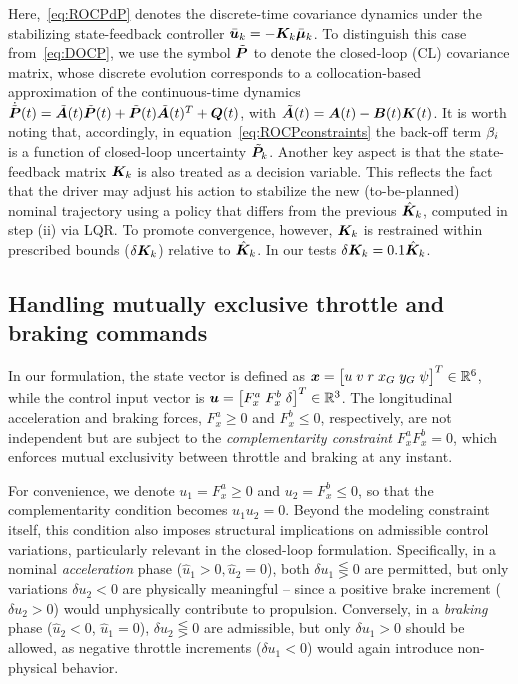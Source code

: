 Here,~\eqref{eq:ROCPdP} denotes the discrete-time covariance dynamics under the stabilizing state-feedback controller \( \bar{\boldsymbol{u}}_k = -\boldsymbol{K}_k \bar{\boldsymbol{\mu}}_k \). To distinguish this case from~\eqref{eq:DOCP}, we use the symbol \( \tilde{\boldsymbol{P}} \) to denote the closed-loop (CL) covariance matrix, whose discrete evolution corresponds to a collocation-based approximation of the continuous-time dynamics $\dot{\tilde{\boldsymbol{P}}}(t) = \tilde{\boldsymbol{A}}(t) \tilde{\boldsymbol{P}}(t) + \tilde{\boldsymbol{P}}(t)\tilde{\boldsymbol{A}}(t)^T + \boldsymbol{Q}(t)$, with $\tilde{\boldsymbol{A}}(t)=\boldsymbol{A}(t)-\boldsymbol{B}(t)\boldsymbol{K}(t)$. It is worth noting that, accordingly, in equation~\eqref{eq:ROCPconstraints} the back-off term $\beta_i$ is a function of closed-loop uncertainty $\tilde{\boldsymbol{P}}_k$. Another key aspect is that the state-feedback matrix $\boldsymbol{K}_k$ is also treated as a decision variable. This reflects the fact that the driver may adjust his action to stabilize the new (to-be-planned) nominal trajectory using a policy that differs from the previous $\hat{\boldsymbol{K}}_k$, computed in step (ii) via LQR. To promote convergence, however, $\boldsymbol{K}_k$ is restrained within prescribed bounds ($\delta \boldsymbol{K}_k$) relative to $\hat{\boldsymbol{K}}_k$. In our tests $\delta \boldsymbol{K}_k = 0.1 \hat{\boldsymbol{K}}_k$.

\subsection{Handling mutually exclusive throttle and braking commands}
In our formulation, the state vector is defined as $\boldsymbol{x}=\big[u\;v\;r\;x_{G}\;y_{G}\;\psi \big]^T\in\mathbb{R}^6$, while the control input vector is $\boldsymbol{u}=\big[F_x^a\;F_x^b\;\delta \big]^T\in\mathbb{R}^3$. The longitudinal acceleration and braking forces, $F_x^a \geq 0$ and $F_x^b \leq 0$, respectively, are not independent but are subject to the \emph{complementarity constraint} $F_x^a F_x^b = 0$, which enforces mutual exclusivity between throttle and braking at any instant.

For convenience, we denote $u_1 = F_x^a \geq 0$ and $u_2 = F_x^b \leq 0$, so that the complementarity condition becomes $u_1 u_2 = 0$. Beyond the modeling constraint itself, this condition also imposes structural implications on admissible control variations, particularly relevant in the closed-loop formulation. 
Specifically, in a nominal \emph{acceleration} phase ($\hat{u}_1 > 0, \hat{u}_2 = 0$), both \(\delta u_1 \lesseqgtr 0\) are permitted, but only variations $\delta u_2 < 0$ are physically meaningful -- since a positive brake increment ($\delta u_2 > 0$) would unphysically contribute to propulsion. Conversely, in a \emph{braking} phase ($\hat{u}_2 < 0$, $\hat{u}_1 = 0$), $\delta u_2 \lesseqgtr 0$ are admissible, but only $\delta u_1 > 0$ should be allowed, as negative throttle increments ($\delta u_1 < 0$) would again introduce non-physical behavior.

